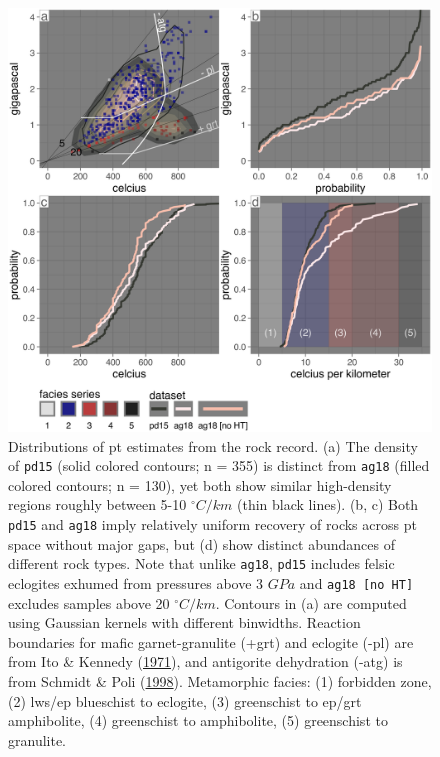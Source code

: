 \begin{figure}[htbp]

{\centering \includegraphics[width=1\linewidth,]{assets/figs/chpt4/rox_comp} 

}

\caption[Compiled \gls{pt} estimates from the rock record]{Distributions of \gls{pt} estimates from the rock record. (a) The density of \texttt{pd15} (solid colored contours; n = 355) is distinct from \texttt{ag18} (filled colored contours; n = 130), yet both show similar high-density regions roughly between 5-10 \(^\circ C/km\) (thin black lines). (b, c) Both \texttt{pd15} and \texttt{ag18} imply relatively uniform recovery of rocks across \gls{pt} space without major gaps, but (d) show distinct abundances of different rock types. Note that unlike \texttt{ag18}, \texttt{pd15} includes felsic eclogites exhumed from pressures above 3 \(GPa\) and \texttt{ag18\ {[}no\ HT{]}} excludes samples above 20 \(^\circ C/km\). Contours in (a) are computed using Gaussian kernels with different binwidths. Reaction boundaries for mafic garnet-granulite (+grt) and eclogite (-pl) are from Ito \& Kennedy (\protect\hyperlink{ref-ito1971}{1971}), and antigorite dehydration (-atg) is from Schmidt \& Poli (\protect\hyperlink{ref-schmidt1998}{1998}). Metamorphic facies: (1) forbidden zone, (2) lws/ep blueschist to eclogite, (3) greenschist to ep/grt amphibolite, (4) greenschist to amphibolite, (5) greenschist to granulite.}\label{fig:rockPTComp}
\end{figure}

